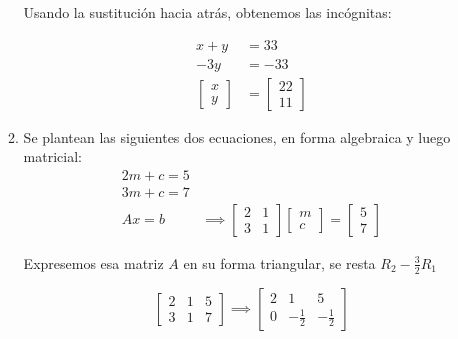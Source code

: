 \begin{enumerate}
\begin{enumerate}
		            Usando la sustitución hacia atrás, obtenemos las incógnitas:

		            \begin{align*}
			            x+y             & =33            \\
			            -3y             & =-33           \\
			            \begin{bmatrix}
				            x \\y
			            \end{bmatrix} & = \begin{bmatrix}
				                              22 \\11
			                              \end{bmatrix}
		            \end{align*}

		      \item Se plantean las siguientes dos ecuaciones, en forma algebraica y luego matricial:
		            \begin{align*}
			            2m+c=5          \\
			            3m+c=7          \\
			            Ax=b & \implies
			            \begin{bmatrix}
				            2 & 1 \\3&1
			            \end{bmatrix} \begin{bmatrix}
				                          m \\c
			                          \end{bmatrix}= \begin{bmatrix}
				                                         5 \\7
			                                         \end{bmatrix}
		            \end{align*}

		            Expresemos esa matriz $A$ en su forma triangular, se resta $R_2 - \frac{3}{2}R_{1}$

		            \begin{equation*}
			            \begin{bmatrix}
				            2 & 1 & 5 \\3&1&7
			            \end{bmatrix} \implies \begin{bmatrix}
				            2 & 1 & 5 \\0&-\frac{1}{2}&-\frac{1}{2}
			            \end{bmatrix}
		            \end{equation*}


\end{enumerate}
\end{enumerate}
